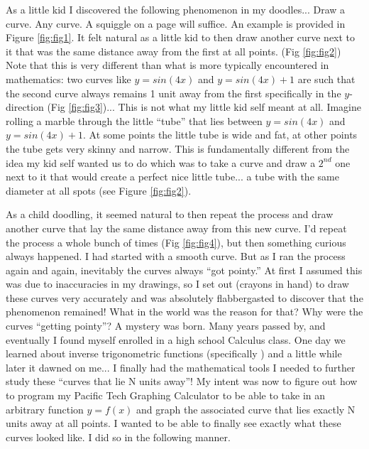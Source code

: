 As a little kid I discovered the following phenomenon in my doodles... Draw a curve. Any curve. A squiggle on a page will suffice. An example is provided in Figure \ref{fig:fig1}. It felt natural as a little kid to then draw another curve next to it that was the same distance away from the first at all points. (Fig \ref{fig:fig2}) Note that this is very different than what is more typically encountered in mathematics: two curves like $y = sin(4x)$ and $y = sin(4x) + 1$ are such that the second curve always remains 1 unit away from the first specifically in the $y$-direction (Fig \ref{fig:fig3})... This is not what my little kid self meant at all. Imagine rolling a marble through the little “tube” that lies between $y = sin(4x)$ and $y = sin(4x) + 1$. At some points the little tube is wide and fat, at other points the tube gets very skinny and narrow. This is fundamentally different from the idea my kid self wanted us to do which was to take a curve and draw a $2^{nd}$ one next to it that would create a perfect nice little tube... a tube with the same diameter at all spots (see Figure \ref{fig:fig2}).



As a child doodling, it seemed natural to then repeat the process and draw another curve that lay the same distance away from this new curve. I’d repeat the process a whole bunch of times (Fig \ref{fig:fig4}), but then something curious always happened. I had started with a smooth curve. But as I ran the process again and again, inevitably the curves always “got pointy.” At first I assumed this was due to inaccuracies in my drawings, so I set out (crayons in hand) to draw these curves very accurately and was absolutely flabbergasted to discover that the phenomenon remained! What in the world was the reason for that? Why were the curves “getting pointy”? A mystery was born. Many years passed by, and eventually I found myself enrolled in a high school Calculus class. One day we learned about inverse trigonometric functions (specifically ) and a little while later it dawned on me... I finally had the mathematical tools I needed to further study these “curves that lie N units away”! My intent was now to figure out how to program my Pacific Tech Graphing Calculator to be able to take in an arbitrary function $y = f(x)$ and graph the associated curve that lies exactly N units away at all points. I wanted to be able to finally see exactly what these curves looked like. I did so in the following manner.